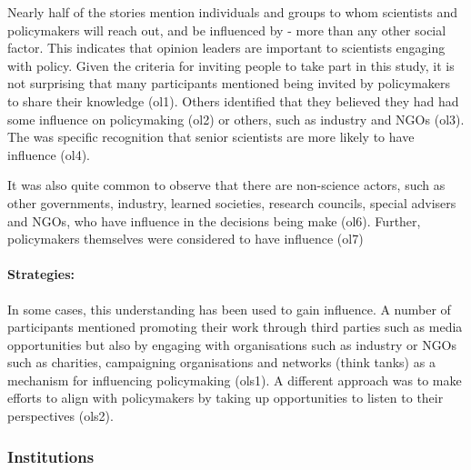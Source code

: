 Nearly half of the stories mention individuals and groups to whom scientists and policymakers will reach out, and be influenced by - more than any other social factor. This indicates that opinion leaders are important to scientists engaging with policy. Given the criteria for inviting people to take part in this study, it is not surprising that many participants mentioned being invited by policymakers to share their knowledge (ol1). Others identified that they believed they had had some influence on policymaking (ol2) or others, such as industry and NGOs (ol3). The was specific recognition that senior scientists are more likely to have influence (ol4).  

It was also quite common to observe that there are non-science actors, such as other governments, industry, learned societies, research councils, special advisers and NGOs, who have influence in the decisions being make (ol6). Further, policymakers themselves were considered to have influence (ol7)

\paragraph{Strategies:}

In some cases, this understanding has been used to gain influence. A number of participants mentioned promoting their work through third parties such as media opportunities but also by engaging with organisations such as industry or NGOs such as charities, campaigning organisations and networks (think tanks) as a mechanism for influencing policymaking (ols1). A different approach was to make efforts to align with policymakers by taking up opportunities to listen to their perspectives (ols2).

\subsubsection{Institutions}\label{sec:resinstitutions}

